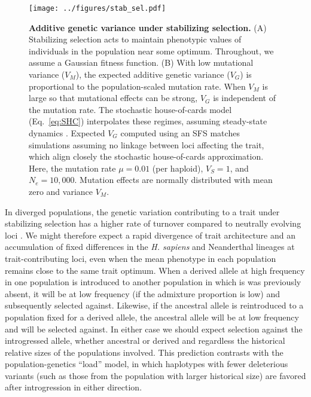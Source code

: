 \documentclass{article}
\newcommand{\moments}{\texttt{moments}\xspace}
\begin{document}
\begin{figure}[tb!]
    \centering
    \texttt{[image: ../figures/stab\_sel.pdf]}
    \caption{
        \textbf{Additive genetic variance under stabilizing selection.}
        (A) Stabilizing selection acts to maintain phenotypic values of individuals
        in the population near some optimum. Throughout, we assume a Gaussian fitness
        function.
        (B) With low mutational variance ($V_M$), the expected additive genetic
        variance ($V_G$) is proportional to the population-scaled mutation rate.
        When $V_M$ is large so that mutational effects can be strong, $V_G$ is
        independent of the mutation rate. The stochastic house-of-cards model
        (Eq.~\ref{eq:SHC}) interpolates these regimes, assuming steady-state
        dynamics \citep{burger1989much}. Expected $V_G$ computed using an SFS
        \citep[using \moments,][]{jouganous2017inferring} matches
        simulations assuming no linkage between loci affecting the trait, which
        align closely the stochastic house-of-cards approximation. Here, the
        mutation rate $\mu=0.01$ (per haploid), $V_S=1$, and $N_e=10,000$.
        Mutation effects are normally distributed with mean zero and variance
        $V_M$.
    }
    \label{fig:stab-sel}
\end{figure}

In diverged populations, the genetic variation contributing to a trait under
stabilizing selection has a higher rate of turnover compared to neutrally
evolving loci \citep{yair2022population}. We might therefore expect a rapid
divergence of trait architecture and an accumulation of fixed differences in
the \emph{H. sapiens} and Neanderthal lineages at trait-contributing loci, even
when the mean phenotype in each population remains close to the same trait
optimum. When a derived allele at high frequency in one population is
introduced to another population in which is was previously absent, it will be
at low frequency (if the admixture proportion is low) and subsequently selected
against. Likewise, if the ancestral allele is reintroduced to a population
fixed for a derived allele, the ancestral allele will be at low frequency and
will be selected against. In either case we should expect selection against the
introgressed allele, whether ancestral or derived and regardless the historical
relative sizes of the populations involved. This prediction contrasts with the
population-genetics ``load'' model, in which haplotypes with fewer deleterious
variants (such as those from the population with larger historical size) are
favored after introgression in either direction.
\end{document}
